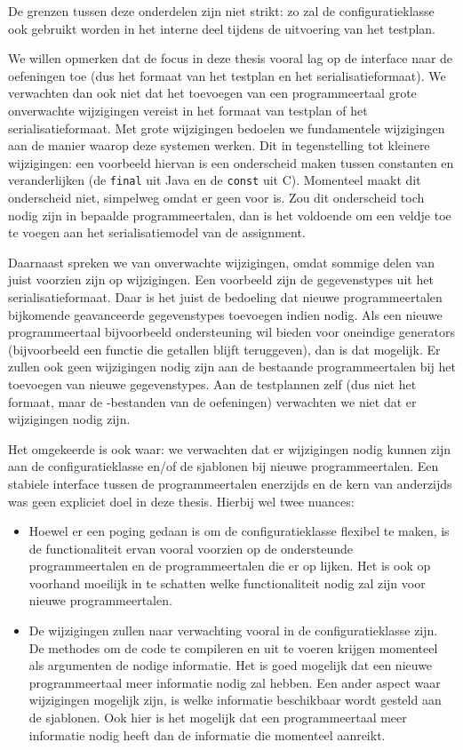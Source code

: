 De grenzen tussen deze onderdelen zijn niet strikt: zo zal de configuratieklasse ook gebruikt worden in het interne deel tijdens de uitvoering van het testplan.

We willen opmerken dat de focus in deze thesis vooral lag op de interface naar de oefeningen toe (dus het formaat van het testplan en het serialisatieformaat).
We verwachten dan ook niet dat het toevoegen van een programmeertaal grote onverwachte wijzigingen vereist in het formaat van testplan of het serialisatieformaat.
Met grote wijzigingen bedoelen we fundamentele wijzigingen aan de manier waarop deze systemen werken.
Dit in tegenstelling tot kleinere wijzigingen: een voorbeeld hiervan is een onderscheid maken tussen constanten en veranderlijken (de \texttt{final} uit Java en de \texttt{const} uit C).
Momenteel maakt \tested{} dit onderscheid niet, simpelweg omdat er geen  voor is.
Zou dit onderscheid toch nodig zijn in bepaalde programmeertalen, dan is het voldoende om een veldje toe te voegen aan het serialisatiemodel van de assignment.

Daarnaast spreken we van onverwachte wijzigingen, omdat sommige delen van \tested{} juist voorzien zijn op wijzigingen.
Een voorbeeld zijn de gegevenstypes uit het serialisatieformaat.
Daar is het juist de bedoeling dat nieuwe programmeertalen bijkomende geavanceerde gegevenstypes toevoegen indien nodig.
Als een nieuwe programmeertaal bijvoorbeeld ondersteuning wil bieden voor oneindige generators (bijvoorbeeld een functie die getallen blijft teruggeven), dan is dat mogelijk.
Er zullen ook geen wijzigingen nodig zijn aan de bestaande programmeertalen bij het toevoegen van nieuwe gegevenstypes.
Aan de testplannen zelf (dus niet het formaat, maar de -bestanden van de oefeningen) verwachten we niet dat er wijzigingen nodig zijn.

Het omgekeerde is ook waar: we verwachten dat er wijzigingen nodig kunnen zijn aan de configuratieklasse en/of de sjablonen bij nieuwe programmeertalen.
Een stabiele interface tussen de programmeertalen enerzijds en de kern van \tested{} anderzijds was geen expliciet doel in deze thesis.
Hierbij wel twee nuances:

\begin{itemize}
    \item Hoewel er een poging gedaan is om de configuratieklasse flexibel te maken, is de functionaliteit ervan vooral voorzien op de ondersteunde programmeertalen en de programmeertalen die er op lijken.
    Het is ook op voorhand moeilijk in te schatten welke functionaliteit nodig zal zijn voor nieuwe programmeertalen.
    \item De wijzigingen zullen naar verwachting vooral in de configuratieklasse zijn.
    De methodes om de code te compileren en uit te voeren krijgen momenteel als argumenten de nodige informatie.
    Het is goed mogelijk dat een nieuwe programmeertaal meer informatie nodig zal hebben.
    Een ander aspect waar wijzigingen mogelijk zijn, is welke informatie beschikbaar wordt gesteld aan de sjablonen.
    Ook hier is het mogelijk dat een programmeertaal meer informatie nodig heeft dan de informatie die \tested{} momenteel aanreikt.
\end{itemize}

